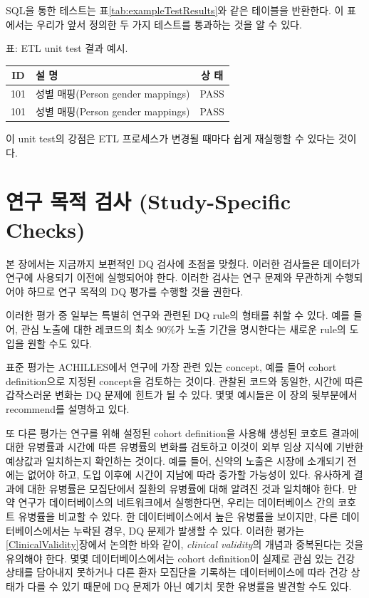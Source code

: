 \documentclass[11pt]{book}
\theoremstyle{definition}
\theoremstyle{definition}
\theoremstyle{definition}
\theoremstyle{remark}
\begin{document}
SQL을 통한 테스트는 표\ref{tab:exampleTestResults}와 같은 테이블을
반환한다. 이 표에서는 우리가 앞서 정의한 두 가지 테스트를 통과하는 것을
알 수 있다.

표: \label{tab:exampleTestResults} ETL unit test 결과 예시.

\begin{longtable}[]{@{}clc@{}}
\toprule
ID & 설 명 & 상 태\tabularnewline
\midrule
\endhead
101 & 성별 매핑(Person gender mappings) & PASS\tabularnewline
101 & 성별 매핑(Person gender mappings) & PASS\tabularnewline
\bottomrule
\end{longtable}

이 unit test의 강점은 ETL 프로세스가 변경될 때마다 쉽게 재실행할 수
있다는 것이다.

\section{연구 목적 검사 (Study-Specific
Checks)}\label{---study-specific-checks}


본 장에서는 지금까지 보편적인 DQ 검사에 초점을 맞췄다. 이러한 검사들은
데이터가 연구에 사용되기 이전에 실행되어야 한다. 이러한 검사는 연구
문제와 무관하게 수행되어야 하므로 연구 목적의 DQ 평가를 수행할 것을
권한다.

이러한 평가 중 일부는 특별히 연구와 관련된 DQ rule의 형태를 취할 수
있다. 예를 들어, 관심 노출에 대한 레코드의 최소 90\%가 노출 기간을
명시한다는 새로운 rule의 도입을 원할 수도 있다.

표준 평가는 ACHILLES에서 연구에 가장 관련 있는 concept, 예를 들어 cohort
definition으로 지정된 concept을 검토하는 것이다. 관찰된 코드와 동일한,
시간에 따른 갑작스러운 변화는 DQ 문제에 힌트가 될 수 있다. 몇몇 예시들은
이 장의 뒷부분에서 recommend를 설명하고 있다.

또 다른 평가는 연구를 위해 설정된 cohort definition을 사용해 생성된
코호트 결과에 대한 유병률과 시간에 따른 유병률의 변화를 검토하고 이것이
외부 임상 지식에 기반한 예상값과 일치하는지 확인하는 것이다. 예를 들어,
신약의 노출은 시장에 소개되기 전에는 없어야 하고, 도입 이후에 시간이
지남에 따라 증가할 가능성이 있다. 유사하게 결과에 대한 유병률은
모집단에서 질환의 유병률에 대해 알려진 것과 일치해야 한다. 만약 연구가
데이터베이스의 네트워크에서 실행한다면, 우리는 데이터베이스 간의 코호트
유병률을 비교할 수 있다. 한 데이터베이스에서 높은 유병률을 보이지만,
다른 데이터베이스에서는 누락된 경우, DQ 문제가 발생할 수 있다. 이러한
평가는 \ref{ClinicalValidity}장에서 논의한 바와 같이, \emph{clinical
validity}의 개념과 중복된다는 것을 유의해야 한다. 몇몇
데이터베이스에서는 cohort definition이 실제로 관심 있는 건강 상태를
담아내지 못하거나 다른 환자 모집단을 기록하는 데이터베이스에 따라 건강
상태가 다를 수 있기 때문에 DQ 문제가 아닌 예기치 못한 유병률을 발견할
수도 있다.
\end{document}
